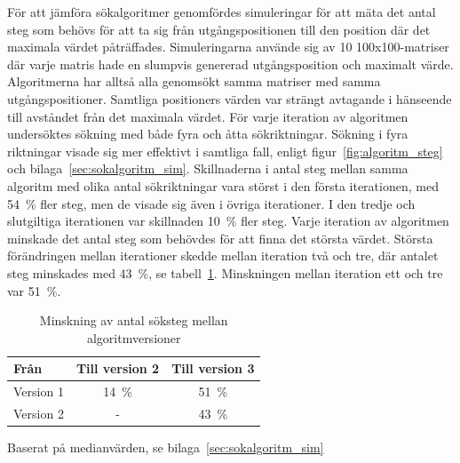             För att jämföra sökalgoritmer genomfördes simuleringar för att mäta det antal steg som behövs för att ta sig från utgångspositionen till den position där det maximala värdet påträffades. Simuleringarna använde sig av 10 100x100-matriser där varje matris hade en slumpvis genererad utgångsposition och maximalt värde. Algoritmerna har alltså alla genomsökt samma matriser med samma utgångspositioner. Samtliga positioners värden var strängt avtagande i hänseende till avståndet från det maximala värdet. För varje iteration av algoritmen undersöktes sökning med både fyra och åtta sökriktningar. Sökning i fyra riktningar visade sig mer effektivt i samtliga fall, enligt figur~\ref{fig:algoritm_steg} och bilaga~\ref{sec:sokalgoritm_sim}. Skillnaderna i antal steg mellan samma algoritm med olika antal sökriktningar vara störst i den första iterationen, med 54~\% fler steg, men de visade sig även i övriga iterationer. I den tredje och slutgiltiga iterationen var skillnaden 10~\% fler steg. Varje iteration av algoritmen minskade det antal steg som behövdes för att finna det största värdet. Största förändringen mellan iterationer skedde mellan iteration två och tre, där antalet steg minskades med 43~\%, se tabell~\ref{tab:algoritm_forbattring}. Minskningen mellan iteration ett och tre var 51~\%. \bigskip

            \begin{table}
                \caption{\label{tab:algoritm_forbattring}Minskning av antal söksteg mellan algoritmversioner}
                \centering
                \begin{threeparttable}
                \begin{tabular}{@{}lcc@{}}
                \toprule
                Från        & \multicolumn{1}{l}{Till version 2} & \multicolumn{1}{l}{Till version 3} \\ \midrule
                Version 1 & 14~\%                                & 51~\%                                \\
                Version 2 & -                                    & 43~\% \\ \bottomrule
                \end{tabular}
                \begin{tablenotes}
                \item Baserat på medianvärden, se bilaga~\ref{sec:sokalgoritm_sim}
            \end{tablenotes}
            \end{threeparttable}
            \end{table}

